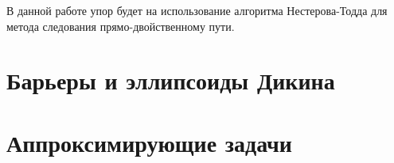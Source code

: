В данной работе упор будет на использование алгоритма Нестерова-Тодда для метода следования прямо-двойственному пути.


\section{Барьеры и эллипсоиды Дикина}

\section{Аппроксимирующие задачи}


